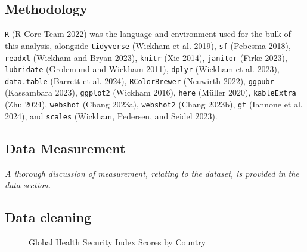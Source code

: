 \documentclass[
  letterpaper,
  DIV=11,
  numbers=noendperiod]{scrartcl}
\begin{document}
\subsection{Methodology}\label{methodology}

\texttt{R} (R Core Team 2022) was the language and environment used for
the bulk of this analysis, alongside \texttt{tidyverse} (Wickham et al.
2019), \texttt{sf} (Pebesma 2018), \texttt{readxl} (Wickham and Bryan
2023), \texttt{knitr} (Xie 2014), \texttt{janitor} (Firke 2023),
\texttt{lubridate} (Grolemund and Wickham 2011), \texttt{dplyr} (Wickham
et al. 2023), \texttt{data.table} (Barrett et al. 2024),
\texttt{RColorBrewer} (Neuwirth 2022), \texttt{ggpubr} (Kassambara
2023), \texttt{ggplot2} (Wickham 2016), \texttt{here} (Müller 2020),
\texttt{kableExtra} (Zhu 2024), \texttt{webshot} (Chang 2023a),
\texttt{webshot2} (Chang 2023b), \texttt{gt} (Iannone et al. 2024), and
\texttt{scales} (Wickham, Pedersen, and Seidel 2023).

\subsection{Data Measurement}\label{data-measurement}

\emph{A thorough discussion of measurement, relating to the dataset, is
provided in the data section.}

\subsection{Data cleaning}\label{data-cleaning}

\begin{figure}


\caption{\label{fig-GHS}Global Health Security Index Scores by Country}

\end{figure}%
\end{document}
